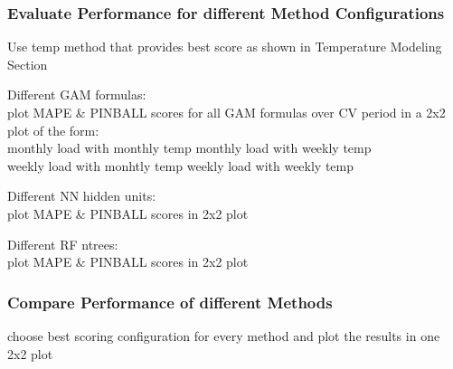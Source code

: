 \documentclass[conference]{IEEEtran}
\begin{document}
\subsubsection{Evaluate Performance for different Method Configurations}
Use temp method that provides best score as shown in Temperature Modeling Section\par
Different GAM formulas:\\
plot MAPE \& PINBALL scores for all GAM formulas over CV period in a 2x2 plot of the form:\\
monthly load with monthly temp \quad monthly load with weekly temp\\
weekly load with monhtly temp \quad weekly load with weekly temp\par
\vspace*{5pt}
Different NN hidden units:\\
plot MAPE \& PINBALL scores in 2x2 plot\par
Different RF ntrees:\\ 
plot MAPE \& PINBALL scores in 2x2 plot\par

\subsubsection{Compare Performance of different Methods}
choose best scoring configuration for every method and plot the results in one 2x2 plot

%
%
\end{document}
